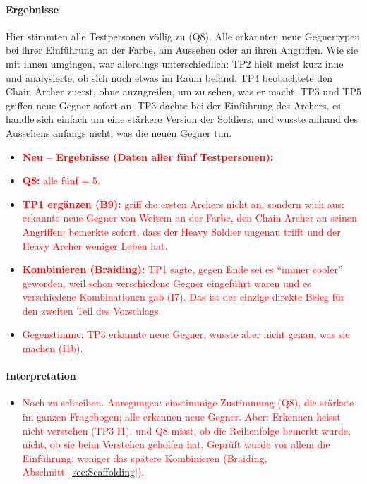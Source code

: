 \documentclass[../Main.tex]{subfiles}
\begin{document}
\paragraph{Ergebnisse}
Hier stimmten alle Testpersonen völlig zu (Q8). Alle erkannten neue Gegnertypen bei ihrer Einführung an der Farbe, am Aussehen oder an ihren Angriffen. Wie sie mit ihnen umgingen, war allerdings unterschiedlich: TP2 hielt meist kurz inne und analysierte, ob sich noch etwas im Raum befand. TP4 beobachtete den Chain Archer zuerst, ohne anzugreifen, um zu sehen, was er macht. TP3 und TP5 griffen neue Gegner sofort an. TP3 dachte bei der Einführung des Archers, es handle sich einfach um eine stärkere Version der Soldiers, und wusste anhand des Aussehens anfangs nicht, was die neuen Gegner tun.

\begin{itemize}[leftmargin=1.5cm]
    \item \textcolor{red}{\textbf{Neu -- Ergebnisse (Daten aller fünf Testpersonen):}}
    \item \textcolor{red}{\textbf{Q8:} alle fünf = 5.}
    \item \textcolor{red}{\textbf{TP1 ergänzen (B9):} griff die ersten Archers nicht an, sondern wich aus; erkannte neue Gegner von Weitem an der Farbe, den Chain Archer an seinen Angriffen; bemerkte sofort, dass der Heavy Soldier ungenau trifft und der Heavy Archer weniger Leben hat.}
    \item \textcolor{red}{\textbf{Kombinieren (Braiding):} TP1 sagte, gegen Ende sei es \enquote{immer cooler} geworden, weil schon verschiedene Gegner eingeführt waren und es verschiedene Kombinationen gab (I7). Das ist der einzige direkte Beleg für den zweiten Teil des Vorschlags.}
    \item \textcolor{red}{Gegenstimme: TP3 erkannte neue Gegner, wusste aber nicht genau, was sie machen (I1b).}
\end{itemize}

\paragraph{Interpretation}
\begin{itemize}[leftmargin=1.5cm]
    \item \textcolor{red}{Noch zu schreiben. Anregungen: einstimmige Zustimmung (Q8), die stärkste im ganzen Fragebogen; alle erkennen neue Gegner. Aber: Erkennen heisst nicht verstehen (TP3 I1), und Q8 misst, ob die Reihenfolge bemerkt wurde, nicht, ob sie beim Verstehen geholfen hat. Geprüft wurde vor allem die Einführung, weniger das spätere Kombinieren (Braiding, Abschnitt~\ref{sec:Scaffolding}).}
\end{itemize}
\end{document}
